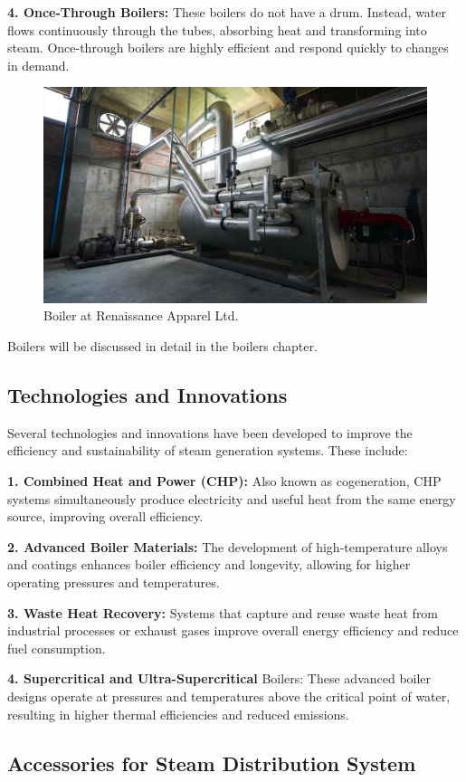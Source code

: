 \textbf{4. Once-Through Boilers:} These boilers do not have a drum. Instead, water flows continuously through the tubes, absorbing heat and transforming into steam. Once-through boilers are highly efficient and respond quickly to changes in demand.

\begin{figure}[h!]
    \centering
    \includegraphics[width=0.8\linewidth]{figs/boiler.jpg}
    \caption{Boiler at Renaissance Apparel Ltd.}
    \label{fig:boiler}
\end{figure}
Boilers will be discussed in detail in the boilers chapter.

\newpage
\subsection{Technologies and Innovations}
Several technologies and innovations have been developed to improve the efficiency and sustainability of steam generation systems. These include:

\textbf{1. Combined Heat and Power (CHP):} Also known as cogeneration, CHP systems simultaneously produce electricity and useful heat from the same energy source, improving overall efficiency.

\textbf{2. Advanced Boiler Materials:} The development of high-temperature alloys and coatings enhances boiler efficiency and longevity, allowing for higher operating pressures and temperatures.

\textbf{3. Waste Heat Recovery:} Systems that capture and reuse waste heat from industrial processes or exhaust gases improve overall energy efficiency and reduce fuel consumption.

\textbf{4. Supercritical and Ultra-Supercritical }Boilers: These advanced boiler designs operate at pressures and temperatures above the critical point of water, resulting in higher thermal efficiencies and reduced emissions.

\subsection{Accessories for Steam Distribution System}

